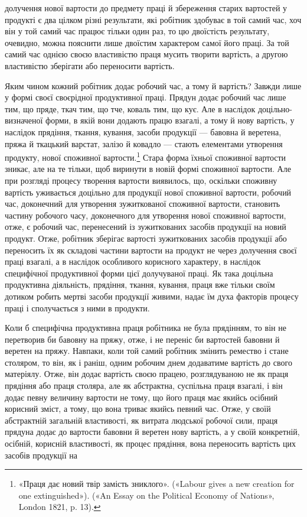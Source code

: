 \parcont{}  %
долучення нової вартости до предмету праці й збереження старих
вартостей у продукті є два цілком різні результати, які робітник
здобуває в той самий час, хоч він у той самий час працює
тільки один раз, то цю двоїстість результату, очевидно, можна
пояснити лише двоїстим характером самої його праці. За той
самий час однією своєю властивістю праця мусить творити вартість,
а другою властивістю зберігати або переносити вартість.

Яким чином кожний робітник додає робочий час, а тому й
вартість? Завжди лише у формі своєї своєрідної продуктивної
праці. Прядун додає робочий час лише тим, що пряде, ткач тим,
що тче, коваль тим, що кує. Але в наслідок доцільно-визначеної
форми, в якій вони додають працю взагалі, а тому й нову вартість,
у наслідок прядіння, ткання, кування, засоби продукції — бавовна
й веретена, пряжа й ткацький варстат, залізо й ковадло — стають
елементами утворення продукту, нової споживної вартости.\footnote{
«Праця дає новий твір замість зниклого». («Labour gives a new
creation for one extinguished»). («An Essay on the Political Economy of
Nations», London 1821, p. 13).
}
Стара форма їхньої споживної вартости зникає, але на те тільки,
щоб виринути в новій формі споживної вартости. Але при розгляді
процесу творення вартости виявилось, що, оскільки споживну
вартість уживається доцільно для продукції нової споживної
вартости, робочий час, доконечний для утворення зужиткованої
споживної вартости, становить частину робочого часу, доконечного
для утворення нової споживної вартости, отже, є робочий
час, перенесений із зужиткованих засобів продукції на новий
продукт. Отже, робітник зберігає вартості зужиткованих засобів
продукції або переносить їх як складові частини вартости на продукт
не через долучення своєї праці взагалі, а в наслідок особливого
корисного характеру, в наслідок специфічної продуктивної
форми цієї долучуваної праці. Як така доцільна продуктивна
діяльність, прядіння, ткання, кування, праця вже тільки своїм
дотиком робить мертві засоби продукції живими, надає їм духа
факторів процесу праці і сполучається з ними в продукти.

Коли б специфічна продуктивна праця робітника не була прядінням,
то він не перетворив би бавовну на пряжу, отже, і не
переніс би вартостей бавовни й веретен на пряжу. Навпаки, коли
той самий робітник змінить ремество і стане столяром, то він,
як і раніш, одним робочим днем додаватиме вартість до свого
матеріялу. Отже, він додає вартість своєю працею, розглядуваною
не як праця прядіння або праця столяра, але як абстрактна,
суспільна праця взагалі, і він додає певну величину вартости не
тому, що його праця має якийсь осібний корисний зміст, а тому,
що вона триває якийсь певний час. Отже, у своїй абстрактній
загальній властивості, як витрата людської робочої сили, праця
прядуна додає до вартости бавовни й веретен нову вартість, а
у своїй конкретній, осібній, корисній властивості, як процес
прядіння, вона переносить вартість цих засобів продукції на
\parbreak{}  %

